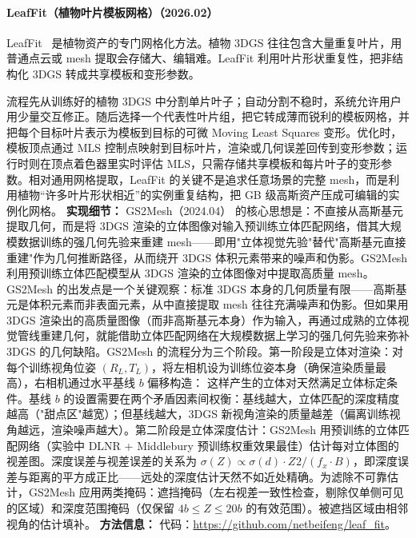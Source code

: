 \paragraph{LeafFit（植物叶片模板网格）（2026.02）}
LeafFit~\cite{2602_11577} 是植物资产的专门网格化方法。植物 3DGS 往往包含大量重复叶片，用普通点云或 mesh 提取会存储大、编辑难。LeafFit 利用叶片形状重复性，把非结构化 3DGS 转成共享模板和变形参数。

流程先从训练好的植物 3DGS 中分割单片叶子；自动分割不稳时，系统允许用户用少量交互修正。随后选择一个代表性叶片组，把它转成薄而锐利的模板网格，并把每个目标叶片表示为模板到目标的可微 Moving Least Squares 变形。优化时，模板顶点通过 MLS 控制点映射到目标叶片，渲染或几何误差回传到变形参数；运行时则在顶点着色器里实时评估 MLS，只需存储共享模板和每片叶子的变形参数。相对通用网格提取，LeafFit 的关键不是追求任意场景的完整 mesh，而是利用植物“许多叶片形状相近”的实例重复结构，把 GB 级高斯资产压成可编辑的实例化网格。
\textbf{实现细节：} GS2Mesh（2024.04） 的核心思想是：不直接从高斯基元提取几何，而是将 3DGS 渲染的立体图像对输入预训练立体匹配网络，借其大规模数据训练的强几何先验来重建 mesh——即用"立体视觉先验"替代"高斯基元直接重建"作为几何推断路径，从而绕开 3DGS 体积元素带来的噪声和伪影。GS2Mesh 利用预训练立体匹配模型从 3DGS 渲染的立体图像对中提取高质量 mesh。GS2Mesh 的出发点是一个关键观察：标准 3DGS 本身的几何质量有限——高斯基元是体积元素而非表面元素，从中直接提取 mesh 往往充满噪声和伪影。但如果用 3DGS 渲染出的高质量图像（而非高斯基元本身）作为输入，再通过成熟的立体视觉管线重建几何，就能借助立体匹配网络在大规模数据上学习的强几何先验来弥补 3DGS 的几何缺陷。GS2Mesh 的流程分为三个阶段。第一阶段是立体对渲染：对每个训练视角位姿 $(R_L, T_L)$，将左相机设为训练位姿本身（确保渲染质量最高），右相机通过水平基线 $b$ 偏移构造： 这样产生的立体对天然满足立体标定条件。基线 $b$ 的设置需要在两个矛盾因素间权衡：基线越大，立体匹配的深度精度越高（"甜点区"越宽）；但基线越大，3DGS 新视角渲染的质量越差（偏离训练视角越远，渲染噪声越大）。第二阶段是立体深度估计：GS2Mesh 用预训练的立体匹配网络（实验中 DLNR + Middlebury 预训练权重效果最佳）估计每对立体图的视差图。深度误差与视差误差的关系为 $\sigma(Z) \propto \sigma(d) \cdot Z^{}2 / (f_x \cdot B)$，即深度误差与距离的平方成正比——远处的深度估计天然不如近处精确。为滤除不可靠估计，GS2Mesh 应用两类掩码：遮挡掩码（左右视差一致性检查，剔除仅单侧可见的区域）和深度范围掩码（仅保留 $4b \leq Z \leq 20b$ 的有效范围）。被遮挡区域由相邻视角的估计填补。
\textbf{方法信息：} 代码：\url{https://github.com/netbeifeng/leaf_fit}。
